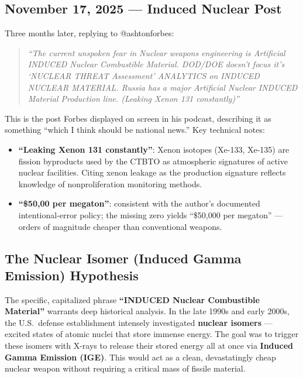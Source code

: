 \documentclass[11pt]{article}
\begin{document}
\subsection{November 17, 2025 — Induced Nuclear Post}

Three months later, replying to @ashtonforbes:

\begin{quote}
\emph{``The current unspoken fear in Nuclear weapons engineering is Artificial INDUCED Nuclear Combustible Material. DOD/DOE doesn't focus it's `NUCLEAR THREAT Assessment' ANALYTICS on INDUCED NUCLEAR MATERIAL. Russia has a major Artificial Nuclear INDUCED Material Production line. (Leaking Xenon 131 constantly)''}
\end{quote}

This is the post Forbes displayed on screen in his podcast, describing it as something ``which I think should be national news.'' Key technical notes:

\begin{itemize}
  \item \textbf{``Leaking Xenon 131 constantly''}: Xenon isotopes (Xe-133, Xe-135) are fission byproducts used by the CTBTO as atmospheric signatures of active nuclear facilities. Citing xenon leakage as the production signature reflects knowledge of nonproliferation monitoring methods.
  \item \textbf{``\$50,00 per megaton''}: consistent with the author's documented intentional-error policy; the missing zero yields ``\$50,000 per megaton'' — orders of magnitude cheaper than conventional weapons.
\end{itemize}

\subsection{The Nuclear Isomer (Induced Gamma Emission) Hypothesis}

The specific, capitalized phrase \textbf{``INDUCED Nuclear Combustible Material''} warrants deep historical analysis. In the late 1990s and early 2000s, the U.S.\ defense establishment intensely investigated \textbf{nuclear isomers} — excited states of atomic nuclei that store immense energy. The goal was to trigger these isomers with X-rays to release their stored energy all at once via \textbf{Induced Gamma Emission (IGE)}. This would act as a clean, devastatingly cheap nuclear weapon without requiring a critical mass of fissile material. 
\end{document}
